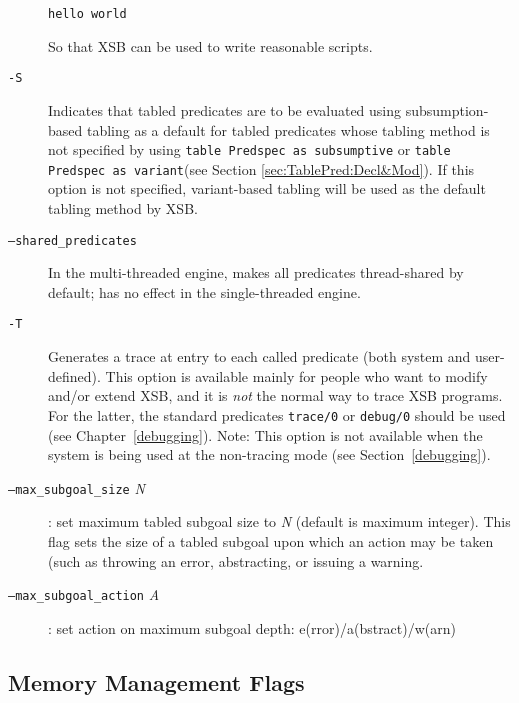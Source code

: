 \begin{description}
\begin{verbatim}
hello world
\end{verbatim}
So that XSB can be used to write reasonable scripts.
\item[{\tt -S}] Indicates that tabled predicates are to be evaluated
  using subsumption-based tabling as a default for tabled predicates
  whose tabling method is not specified by using {\tt table Predspec
    as subsumptive} or {\tt table Predspec as variant}(see Section
  \ref{sec:TablePred:Decl&Mod}).  If this option is not specified,
  variant-based tabling will be used as the default tabling method by
  XSB\@.  
\item[{\tt --shared\_predicates}] In the multi-threaded engine, makes
    all predicates thread-shared by default; has no effect in the
    single-threaded engine.
%
\item[{\tt -T}] Generates a trace at entry to each called predicate
    (both system and user-defined).  This option is available mainly
    for people who want to modify and/or extend XSB, and it is
    {\em not\/} the normal way to trace XSB programs.  For the
    latter, the standard predicates {\tt trace/0} or {\tt debug/0}
    should be used (see Chapter~\ref{debugging}).
    Note: This option is not available when the system is being used
    at the non-tracing mode (see Section~\ref{debugging}).
%
\item[{\tt --max\_subgoal\_size} {\em N}] : set maximum tabled subgoal
  size to {\em N} (default is maximum integer).  This flag sets the
  size of a tabled subgoal upon which an action may be taken (such as
  throwing an error, abstracting, or issuing a warning.
%
\item[{\tt --max\_subgoal\_action} {\em A}] : set action on maximum
  subgoal depth: e(rror)/a(bstract)/w(arn)
\end{description}
%
\subsection{Memory Management Flags} \label{sec:memory-flags}

